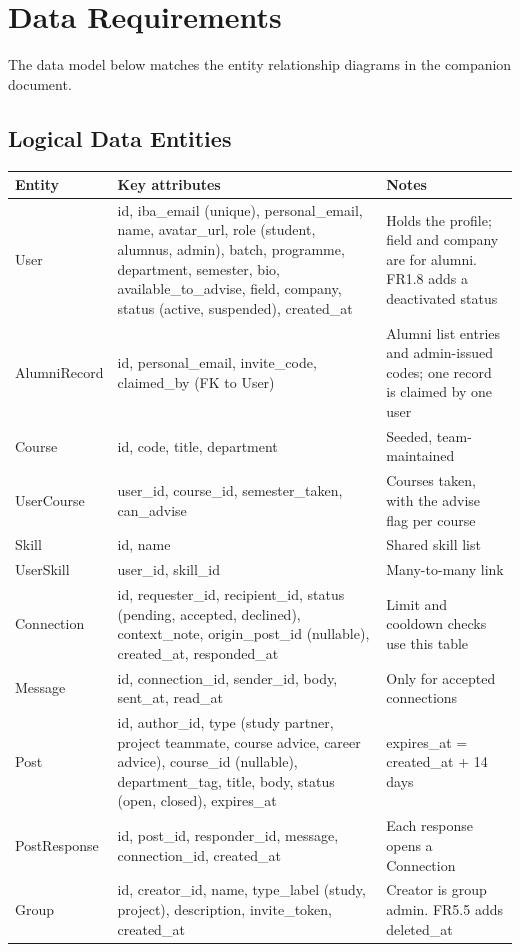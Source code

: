 \documentclass[10pt,a4paper]{article}
\begin{document}
\section{Data Requirements}
The data model below matches the entity relationship diagrams in the companion document.

\subsection{Logical Data Entities}
{\small
\begin{longtable}{@{}p{24mm} >{\raggedright\arraybackslash}p{78mm} >{\raggedright\arraybackslash}p{48mm}@{}}
\toprule
\textbf{Entity} & \textbf{Key attributes} & \textbf{Notes}\\\midrule\endhead
User & id, iba\_email (unique), personal\_email, name, avatar\_url, role (student, alumnus, admin), batch, programme, department, semester, bio, available\_to\_advise, field, company, status (active, suspended), created\_at & Holds the profile; field and company are for alumni. FR1.8 adds a deactivated status\\
AlumniRecord & id, personal\_email, invite\_code, claimed\_by (FK to User) & Alumni list entries and admin-issued codes; one record is claimed by one user\\
Course & id, code, title, department & Seeded, team-maintained\\
UserCourse & user\_id, course\_id, semester\_taken, can\_advise & Courses taken, with the advise flag per course\\
Skill & id, name & Shared skill list\\
UserSkill & user\_id, skill\_id & Many-to-many link\\
Connection & id, requester\_id, recipient\_id, status (pending, accepted, declined), context\_note, origin\_post\_id (nullable), created\_at, responded\_at & Limit and cooldown checks use this table\\
Message & id, connection\_id, sender\_id, body, sent\_at, read\_at & Only for accepted connections\\
Post & id, author\_id, type (study partner, project teammate, course advice, career advice), course\_id (nullable), department\_tag, title, body, status (open, closed), expires\_at & expires\_at = created\_at + 14 days\\
PostResponse & id, post\_id, responder\_id, message, connection\_id, created\_at & Each response opens a Connection\\
Group & id, creator\_id, name, type\_label (study, project), description, invite\_token, created\_at & Creator is group admin. FR5.5 adds deleted\_at\\

\end{longtable}}
\end{document}
